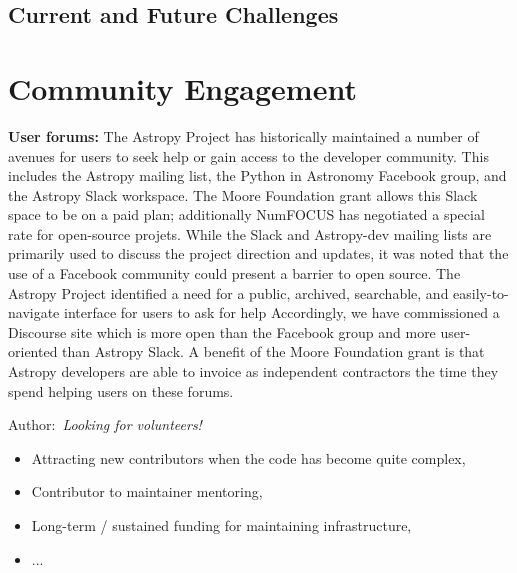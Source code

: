 \documentclass[modern]{aastex631}
\newcommand{\secunfilled}{{\color{red}Author:~\textit{Looking for volunteers!}}}
\begin{document}
\subsection{Current and Future Challenges}

\section{Community Engagement}

\item {\bf User forums:} The Astropy Project has historically maintained a number of avenues for users to seek help or gain access to the developer community. This includes the Astropy mailing list, the Python in Astronomy Facebook group, and the Astropy Slack workspace. The Moore Foundation grant allows this Slack space to
be on a paid plan; additionally NumFOCUS has negotiated a special rate for
open-source projets. While the Slack and Astropy-dev mailing lists are primarily used to discuss the project direction and updates, it was noted that the use of a Facebook community could present a barrier to open source. The Astropy Project identified a need for a public, archived, searchable, and easily-to-navigate interface for users to ask for help Accordingly, we have commissioned
a Discourse site which is more open than the Facebook group and more user-oriented
than Astropy Slack. A benefit of the Moore Foundation grant is that Astropy
developers are able to invoice as independent contractors the time they
spend helping users on these forums.

\secunfilled

\begin{itemize}
\item Attracting new contributors when the code has become quite complex,
\item Contributor to maintainer mentoring,
\item Long-term / sustained funding for maintaining infrastructure,
\item ...
\end{itemize}
\end{document}
